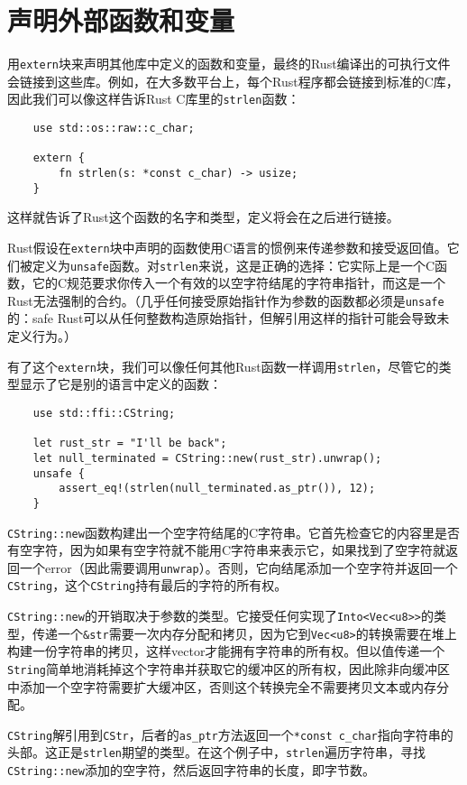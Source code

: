 \section{声明外部函数和变量}
用\texttt{extern}块来声明其他库中定义的函数和变量，最终的Rust编译出的可执行文件会链接到这些库。例如，在大多数平台上，每个Rust程序都会链接到标准的C库，因此我们可以像这样告诉Rust C库里的\texttt{strlen}函数：
\begin{verbatim}
    use std::os::raw::c_char;

    extern {
        fn strlen(s: *const c_char) -> usize;
    }
\end{verbatim}

这样就告诉了Rust这个函数的名字和类型，定义将会在之后进行链接。

Rust假设在\texttt{extern}块中声明的函数使用C语言的惯例来传递参数和接受返回值。它们被定义为\texttt{unsafe}函数。对\texttt{strlen}来说，这是正确的选择：它实际上是一个C函数，它的C规范要求你传入一个有效的以空字符结尾的字符串指针，而这是一个Rust无法强制的合约。（几乎任何接受原始指针作为参数的函数都必须是\texttt{unsafe}的：safe Rust可以从任何整数构造原始指针，但解引用这样的指针可能会导致未定义行为。）

有了这个\texttt{extern}块，我们可以像任何其他Rust函数一样调用\texttt{strlen}，尽管它的类型显示了它是别的语言中定义的函数：
\begin{verbatim}
    use std::ffi::CString;

    let rust_str = "I'll be back";
    let null_terminated = CString::new(rust_str).unwrap();
    unsafe {
        assert_eq!(strlen(null_terminated.as_ptr()), 12);
    }
\end{verbatim}

\texttt{CString::new}函数构建出一个空字符结尾的C字符串。它首先检查它的内容里是否有空字符，因为如果有空字符就不能用C字符串来表示它，如果找到了空字符就返回一个error（因此需要调用\texttt{unwrap}）。否则，它向结尾添加一个空字符并返回一个\texttt{CString}，这个\texttt{CString}持有最后的字符的所有权。

\texttt{CString::new}的开销取决于参数的类型。它接受任何实现了\texttt{Into<Vec<u8>>}的类型，传递一个\texttt{\&str}需要一次内存分配和拷贝，因为它到\texttt{Vec<u8>}的转换需要在堆上构建一份字符串的拷贝，这样vector才能拥有字符串的所有权。但以值传递一个\texttt{String}简单地消耗掉这个字符串并获取它的缓冲区的所有权，因此除非向缓冲区中添加一个空字符需要扩大缓冲区，否则这个转换完全不需要拷贝文本或内存分配。

\texttt{CString}解引用到\texttt{CStr}，后者的\texttt{as\_ptr}方法返回一个\texttt{*const c\_char}指向字符串的头部。这正是\texttt{strlen}期望的类型。在这个例子中，\texttt{strlen}遍历字符串，寻找\texttt{CString::new}添加的空字符，然后返回字符串的长度，即字节数。

